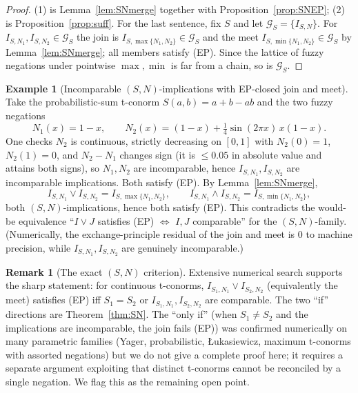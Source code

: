 \documentclass{amsart}
\theoremstyle{plain}
\theoremstyle{definition}
\newtheorem{remark}{Remark}
\newtheorem{example}{Example}
\begin{document}
\begin{proof}
(1) is Lemma~\ref{lem:SNmerge} together with Proposition~\ref{prop:SNEP}; (2) is
Proposition~\ref{prop:suff}.  For the last sentence, fix $S$ and let
$\mathcal G_S=\{I_{S,N}\}$.  For $I_{S,N_1},I_{S,N_2}\in\mathcal G_S$ the join is
$I_{S,\max\{N_1,N_2\}}\in\mathcal G_S$ and the meet $I_{S,\min\{N_1,N_2\}}\in\mathcal G_S$
by Lemma~\ref{lem:SNmerge}; all members satisfy (EP).  Since the lattice of fuzzy
negations under pointwise $\max,\min$ is far from a chain, so is $\mathcal G_S$.
\end{proof}

\begin{example}[Incomparable $(S,N)$-implications with EP-closed join and meet]\label{ex:SN}
Take the probabilistic-sum t-conorm $S(a,b)=a+b-ab$ and the two fuzzy negations
\[
N_1(x)=1-x,\qquad N_2(x)=(1-x)+\tfrac14\sin(2\pi x)\,x(1-x).
\]
One checks $N_2$ is continuous, strictly decreasing on $[0,1]$ with $N_2(0)=1$,
$N_2(1)=0$, and $N_2-N_1$ changes sign (it is $\le 0.05$ in absolute value and attains both
signs), so $N_1,N_2$ are incomparable, hence $I_{S,N_1},I_{S,N_2}$ are incomparable
implications.  Both satisfy (EP).  By Lemma~\ref{lem:SNmerge},
\[
I_{S,N_1}\vee I_{S,N_2}=I_{S,\max\{N_1,N_2\}},\qquad
I_{S,N_1}\wedge I_{S,N_2}=I_{S,\min\{N_1,N_2\}},
\]
both $(S,N)$-implications, hence both satisfy (EP).  This contradicts the would-be
equivalence ``$I\vee J$ satisfies (EP) $\iff$ $I,J$ comparable'' for the $(S,N)$-family.
(Numerically, the exchange-principle residual of the join and meet is $0$ to machine
precision, while $I_{S,N_1},I_{S,N_2}$ are genuinely incomparable.)
\end{example}

\begin{remark}[The exact $(S,N)$ criterion]\label{rem:SNexact}
Extensive numerical search supports the sharp statement: for continuous t-conorms,
$I_{S_1,N_1}\vee I_{S_2,N_2}$ (equivalently the meet) satisfies \textup{(EP)} iff
$S_1=S_2$ or $I_{S_1,N_1},I_{S_2,N_2}$ are comparable.  The two ``if'' directions are
Theorem~\ref{thm:SN}.  The ``only if'' (when $S_1\ne S_2$ and the implications are
incomparable, the join fails (EP)) was confirmed numerically on many parametric families
(Yager, probabilistic, {\L}ukasiewicz, maximum t-conorms with assorted negations) but we do
not give a complete proof here; it requires a separate argument exploiting that distinct
t-conorms cannot be reconciled by a single negation.  We flag this as the remaining open
point.
\end{remark}
\end{document}
